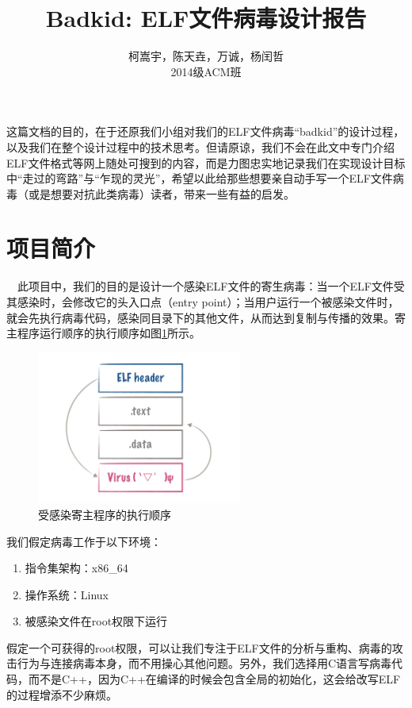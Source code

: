 \documentclass[11pt]{article}
\begin{document}
\title{Badkid: ELF文件病毒设计报告}
\author{柯嵩宇，陈天垚，万诚，杨闰哲\vspace{1em} \\ 2014级ACM班}
\maketitle

这篇文档的目的，在于还原我们小组对我们的ELF文件病毒“badkid”的设计过程，以及我们在整个设计过程中的技术思考。但请原谅，我们不会在此文中专门介绍ELF文件格式等网上随处可搜到的内容，而是力图忠实地记录我们在实现设计目标中“走过的弯路”与“乍现的灵光”，希望以此给那些想要亲自动手写一个ELF文件病毒（或是想要对抗此类病毒）读者，带来一些有益的启发。

\tableofcontents
\newpage
\section{项目简介}
	~~此项目中，我们的目的是设计一个感染ELF文件的寄生病毒：当一个ELF文件受其感染时，会修改它的头入口点（entry point）；当用户运行一个被感染文件时，就会先执行病毒代码，感染同目录下的其他文件，从而达到复制与传播的效果。寄主程序运行顺序的执行顺序如图\ref{fig:order}所示。
	\begin{figure}[htbp]
		\centering
		\includegraphics[width = 0.6\textwidth]{figures/fig1_order}
		\caption{受感染寄主程序的执行顺序}
		\label{fig:order}
	\end{figure}
	
	我们假定病毒工作于以下环境：
	\begin{enumerate}
		\item 指令集架构：x86\_64
		\item 操作系统：Linux
		\item 被感染文件在root权限下运行
	\end{enumerate}
	
	假定一个可获得的root权限，可以让我们专注于ELF文件的分析与重构、病毒的攻击行为与连接病毒本身，而不用操心其他问题。另外，我们选择用C语言写病毒代码，而不是C++，因为C++在编译的时候会包含全局的初始化，这会给改写ELF的过程增添不少麻烦。
	
\end{document}
